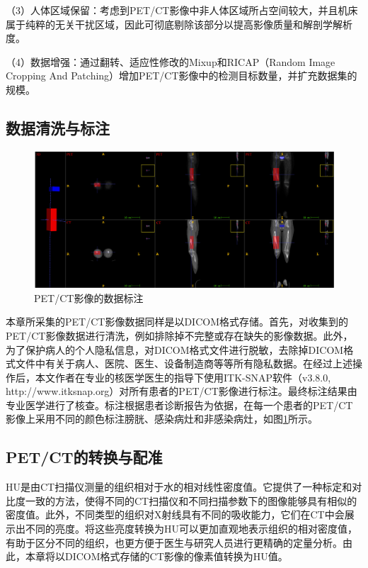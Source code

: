 （3）人体区域保留：考虑到PET/CT影像中非人体区域所占空间较大，并且机床属于纯粹的无关干扰区域，因此可彻底剔除该部分以提高影像质量和解剖学解析度。

（4）数据增强：通过翻转、适应性修改的Mixup和RICAP（Random Image Cropping And Patching）增加PET/CT影像中的检测目标数量，并扩充数据集的规模。

\subsection{数据清洗与标注}

\begin{figure}[htbp]
    \centering
    \includegraphics[width=\textwidth]{figures/chap04_label.jpg}
    \caption{PET/CT影像的数据标注}
    \label{fig:chap04_label}
\end{figure}

本章所采集的PET/CT影像数据同样是以DICOM格式存储。首先，对收集到的PET/CT影像数据进行清洗，例如排除掉不完整或存在缺失的影像数据。此外，为了保护病人的个人隐私信息，对DICOM格式文件进行脱敏，去除掉DICOM格式文件中有关于病人、医院、医生、设备制造商等等所有隐私数据。在经过上述操作后，本文作者在专业的核医学医生的指导下使用ITK-SNAP软件（v3.8.0, http://www.itksnap.org）对所有患者的PET/CT影像进行标注。最终标注结果由专业医学进行了核查。标注根据患者诊断报告为依据，在每一个患者的PET/CT影像上采用不同的颜色标注膀胱、感染病灶和非感染病灶，如图\ref{fig:chap04_label}所示。

\subsection{PET/CT的转换与配准}

HU是由CT扫描仪测量的组织相对于水的相对线性密度值。它提供了一种标定和对比度一致的方法，使得不同的CT扫描仪和不同扫描参数下的图像能够具有相似的密度值。此外，不同类型的组织对X射线具有不同的吸收能力，它们在CT中会展示出不同的亮度。将这些亮度转换为HU可以更加直观地表示组织的相对密度值，有助于区分不同的组织，也更方便于医生与研究人员进行更精确的定量分析。由此，本章将以DICOM格式存储的CT影像的像素值转换为HU值。

